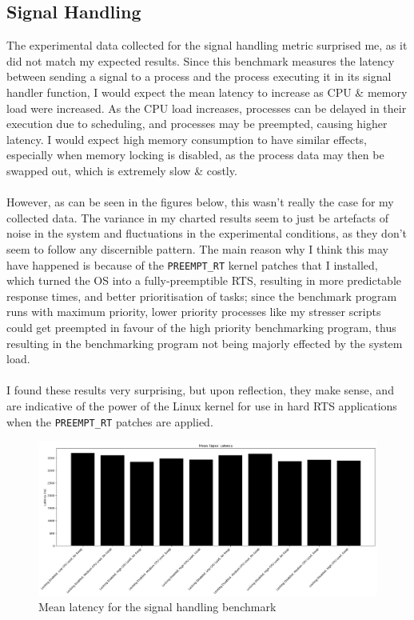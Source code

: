 \documentclass[a4paper]{article}
\begin{document}
\subsection{Signal Handling}
The experimental data collected for the signal handling metric surprised me, as it did not match my expected results.
Since this benchmark measures the latency between sending a signal to a process and the process executing it in its signal handler function, I would expect the mean latency to increase as CPU \& memory load were increased.
As the CPU load increases, processes can be delayed in their execution due to scheduling, and processes may be preempted, causing higher latency.
I would expect high memory consumption to have similar effects, especially when memory locking is disabled, as the process data may then be swapped out, which is extremely slow \& costly.
\\\\
However, as can be seen in the figures below, this wasn't really the case for my collected data.
The variance in my charted results seem to just be artefacts of noise in the system and fluctuations in the experimental conditions, as they don't seem to follow any discernible pattern.
The main reason why I think this may have happened is because of the \verb|PREEMPT_RT| kernel patches that I installed, which turned the OS into a fully-preemptible RTS, resulting in more predictable response times, and better prioritisation of tasks;
since the benchmark program runs with maximum priority, lower priority processes like my stresser scripts could get preempted in favour of the high priority benchmarking program, thus resulting in the benchmarking program not being majorly effected by the system load.
\\\\
I found these results very surprising, but upon reflection, they make sense, and are indicative of the power of the Linux kernel for use in hard RTS applications when the \verb|PREEMPT_RT| patches are applied.

\begin{figure}[H]
    \centering
    \includegraphics[width=\textwidth]{./images/signal-mean.png}
    \caption{Mean latency for the signal handling benchmark}
\end{figure}
\end{document}
